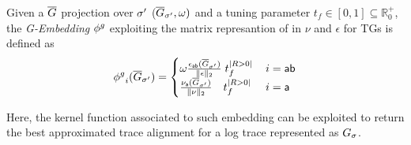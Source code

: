 {{%
\begin{definition}[G-Embedding]\label{def:ppne}
Given a $\overline{G}$ projection over ${\sigma'}$ ($\overline{G}_{\sigma'},\omega)$ and a tuning parameter $t_f\in[0,1]\subseteq\mathbb{R}^+_{0}$, the \emph{G-Embedding} ${\phi^{g}}$ %
exploiting the matrix represantion of\cite{GartnerFW03} in $\nu$ and $\epsilon$ for TGs is defined as
$${\phi^{g}}_{i}(\overline{G}_{\sigma'})=\begin{cases}
	\omega \frac{\epsilon_{\mathsf{ab}}(\overline{G}_{\sigma'})}{\|\epsilon\|_2}\;t_f^{|R>0|}\, & {i}=\mathsf{ab}\\
	\frac{\nu_{\mathsf{a}}(\overline{G}_{\sigma'})}{\|\nu\|_2}\;\;\;\,t_f^{|R>0|}\, & {i}=\mathsf{a}\\
\end{cases}$$
\end{definition}
%
Here, the kernel function associated to such embedding can be exploited to return the best approximated trace alignment for a log trace represented as $G_{\sigma}$. %
}}
